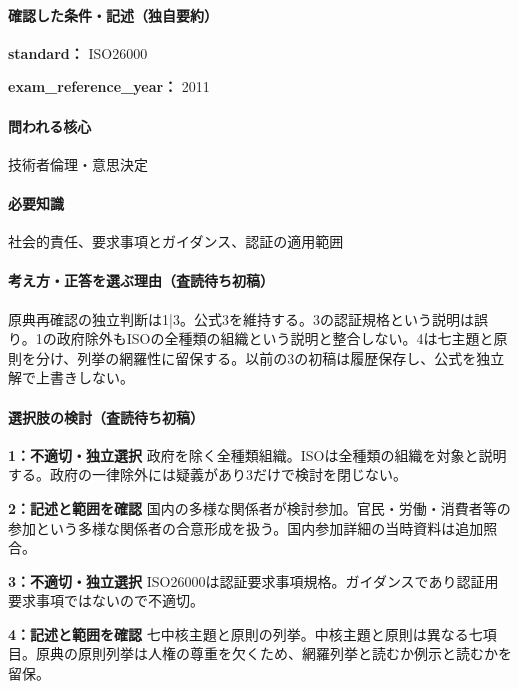\paragraph{確認した条件・記述（独自要約）}\mbox{}\par

\noindent\textbf{standard：} ISO26000\par

\noindent\textbf{exam\_reference\_year：} 2011\par

\paragraph{問われる核心} 技術者倫理・意思決定

\paragraph{必要知識} 社会的責任、要求事項とガイダンス、認証の適用範囲

\paragraph{考え方・正答を選ぶ理由（査読待ち初稿）} 原典再確認の独立判断は1|3。公式3を維持する。3の認証規格という説明は誤り。1の政府除外もISOの全種類の組織という説明と整合しない。4は七主題と原則を分け、列挙の網羅性に留保する。以前の3の初稿は履歴保存し、公式を独立解で上書きしない。

\paragraph{選択肢の検討（査読待ち初稿）}\mbox{}\par

\noindent\textbf{1：不適切・独立選択} 政府を除く全種類組織。ISOは全種類の組織を対象と説明する。政府の一律除外には疑義があり3だけで検討を閉じない。\par

\noindent\textbf{2：記述と範囲を確認} 国内の多様な関係者が検討参加。官民・労働・消費者等の参加という多様な関係者の合意形成を扱う。国内参加詳細の当時資料は追加照合。\par

\noindent\textbf{3：不適切・独立選択} ISO26000は認証要求事項規格。ガイダンスであり認証用要求事項ではないので不適切。\par

\noindent\textbf{4：記述と範囲を確認} 七中核主題と原則の列挙。中核主題と原則は異なる七項目。原典の原則列挙は人権の尊重を欠くため、網羅列挙と読むか例示と読むかを留保。\par

